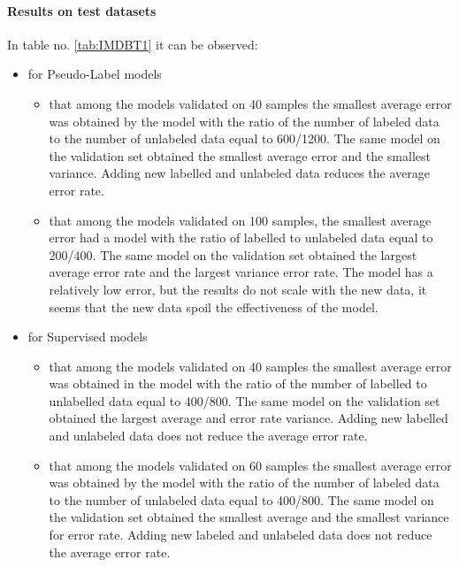 \documentclass[12pt]{article}
\theoremstyle{definition}
\DeclareRobustCommand{\[}{\begin{equation}}
\DeclareRobustCommand{\]}{\end{equation}}
\begin{document}
\paragraph{Results on test datasets}
In table no. \ref{tab:IMDBT1} it can be observed:
\begin{itemize}
    \item for Pseudo-Label models
    \begin{itemize}
        \item that among the models validated on 40 samples the smallest average error was obtained by the model with the ratio of the number of labeled data to the number of unlabeled data equal to 600/1200. The same model on the validation set obtained the smallest average error and the smallest variance. Adding new labelled and unlabeled data reduces the average error rate. 
        
        \item that among the models validated on 100 samples, the smallest average error had a model with the ratio of labelled to unlabeled data equal to 200/400. The same model on the validation set obtained the largest average error rate and the largest variance error rate. The model has a relatively low error, but the results do not scale with the new data, it seems that the new data spoil the effectiveness of the model.
        
    \end{itemize}
    \item for Supervised models
    \begin{itemize}
        \item that among the models validated on 40 samples the smallest average error was obtained in the model with the ratio of the number of labelled to unlabelled data equal to 400/800. The same model on the validation set obtained the largest average and error rate variance. Adding new labelled and unlabeled data does not reduce the average error rate. 
        
        \item that among the models validated on 60 samples the smallest average error was obtained by the model with the ratio of the number of labeled data to the number of unlabeled data equal to 400/800. The same model on the validation set obtained the smallest average  and the smallest variance for error rate. Adding new labeled and unlabeled data does not reduce the average error rate. 
    \end{itemize}
\end{itemize}
\end{document}
